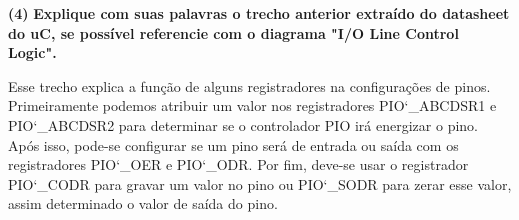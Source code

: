 \documentclass[11pt]{article}
\renewcommand\part[1]{\vspace{.10in}\textbf{(#1)}}
\newcommand\pinooutput{\vspace{.10in}\textbf{Explique com suas palavras o trecho anterior extraído
		do datasheet do uC, se possível referencie com o diagrama
		"I/O Line Control Logic".}}
\begin{document}
\raggedright
\part{4}
\pinooutput

\RaggedRight
Esse trecho explica a função de alguns registradores na configurações de pinos. Primeiramente podemos atribuir um valor nos registradores PIO\char`_ABCDSR1 e PIO\char`_ABCDSR2 para determinar se o controlador PIO irá energizar o pino. Após isso, pode-se configurar se um pino será de entrada ou saída com os registradores PIO\char`_OER e PIO\char`_ODR. Por fim, deve-se usar o registrador PIO\char`_CODR para gravar um valor no pino ou PIO\char`_SODR para zerar esse valor, assim determinado o valor de saída do pino.

{}

\end{document}
